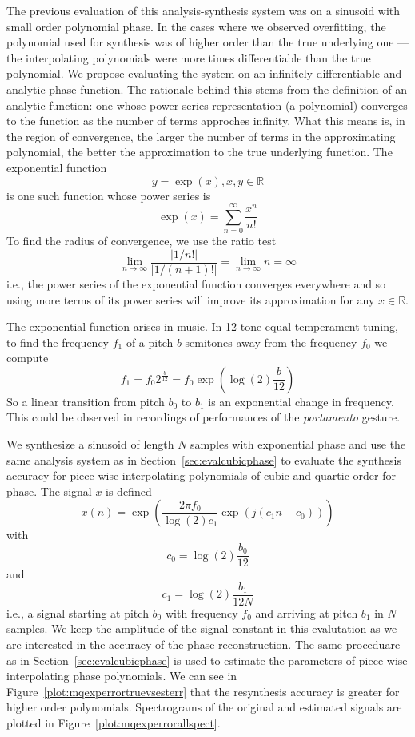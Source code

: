 The previous evaluation of this analysis-synthesis system was on a sinusoid with
small order polynomial phase. In the cases where we observed overfitting, the
polynomial used for synthesis was of higher order than the true underlying one
--- the interpolating polynomials were more times differentiable than the true
polynomial. We propose evaluating the system on an infinitely differentiable and
analytic phase function. The rationale behind this stems from the definition of
an analytic function: one whose power series representation (a polynomial)
converges to the function as the number of terms approches infinity. What this
means is, in the region of convergence, the larger the number of terms in the
approximating polynomial, the better the approximation to the true underlying
function. The exponential function
\[
    y=\exp(x), x,y \in \mathbb{R}
\]
is one such function whose power series is
\[
    \exp(x)=\sum_{n=0}^{\infty} \frac{x^{n}}{n!}
\]
To find the radius of convergence, we use the ratio test
\[
    \lim_{n \rightarrow \infty} \frac{|1/n!|}{|1/(n+1)!|} = \lim_{n \rightarrow \infty} n = \infty
\]
i.e., the power series of the exponential function converges everywhere and so
using more terms of its power series will improve its approximation for
any $x \in \mathbb{R}$.

The exponential function arises in music. In 12-tone equal temperament tuning,
to find the frequency $f_{1}$ of a pitch $b$-semitones away from the frequency
$f_{0}$ we compute
\[
    f_{1}=f_{0}2^{\frac{b}{12}}=f_{0}\exp(\log(2)\frac{b}{12})
\]
So a linear transition from pitch $b_{0}$ to $b_{1}$ is an exponential change in
frequency. This could be observed in recordings of performances of the
\textit{portamento} gesture.

We synthesize a sinusoid  of length $N$ samples with exponential phase and use
the same analysis system as in Section~\ref{sec:evalcubicphase} to evaluate the
synthesis accuracy for piece-wise interpolating polynomials of cubic and quartic
order for phase. The signal $x$ is defined
\[
    x(n) = \exp(\frac{2\pi f_{0}}{\log(2)c_{1}}\exp(j(c_{1}n + c_{0})))
\]
with
\[
    c_{0} = \log(2)\frac{b_{0}}{12}
\]
and
\[
    c_{1}= \log(2)\frac{b_{1}}{12N}
\]
i.e., a signal starting at pitch $b_{0}$ with frequency $f_{0}$ and arriving at
pitch $b_{1}$ in $N$ samples. We keep the amplitude of the signal constant in
this evalutation as we are interested in the accuracy of the phase
reconstruction. The same proceduare as in
Section~\ref{sec:evalcubicphase} is used to estimate the parameters of
piece-wise interpolating phase polynomials. We can see in
Figure~\ref{plot:mqexperrortruevsesterr} that the resynthesis accuracy is
greater for higher order polynomials. Spectrograms of the original and estimated
signals are plotted in Figure~\ref{plot:mqexperrorallspect}.

